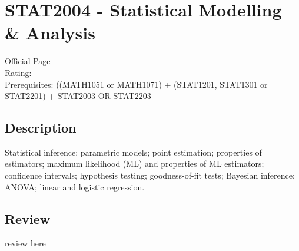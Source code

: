 \hypertarget{STAT2004}{\section{STAT2004 - Statistical Modelling \& Analysis}}

\large
\textcolor{turbo_purple}{\href{https://my.uq.edu.au/programs-courses/course.html?course_code=STAT2004}{Official Page}} \\
Rating: \cstar\cstar\cstar\cstar\ostar \\
Prerequisites: ((MATH1051 or MATH1071) + (STAT1201, STAT1301 or STAT2201) + STAT2003 OR STAT2203

\normalsize
\subsection*{Description}
Statistical inference; parametric models; point estimation; properties of estimators; maximum likelihood (ML) and properties of ML estimators; confidence intervals; hypothesis testing; goodness-of-fit tests; Bayesian inference; ANOVA; linear and logistic regression.

\subsection*{Review}
review here
